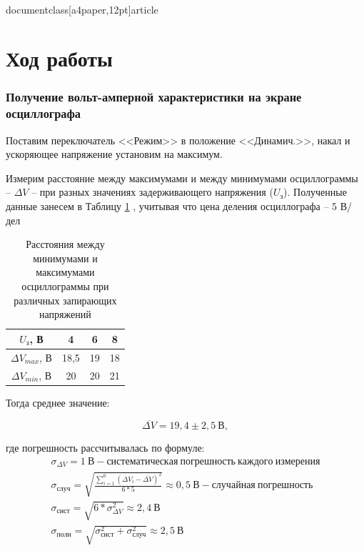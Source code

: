 \\documentclass[a4paper,12pt]{article}
\begin{document}
\section*{Ход работы}

\subsubsection*{Получение вольт-амперной характеристики на экране осциллографа}

Поставим переключатель <<Режим>> в положение <<Динамич.>>, накал и ускоряющее напряжение установим на максимум.

Измерим расстояние между максимумами и между минимумами осциллограммы -- $\Delta V$ -- при разных значениях задерживающего напряжения ($U_з$). Полученные данные занесем в Таблицу \ref{table1} , учитывая что цена деления осциллографа -- 5 В/дел

\begin{table}[h!]
	\begin{center}
	\caption{Расстояния между минимумами и максимумами осциллограммы при различных запирающих напряжений}
	\label{table1}
	\begin{tabular}{|c|c|c|c|}
		\hline
		$U_з$, В & 4 & 6 & 8 \\ \hline
		$\Delta V_{max}$, В & 18,5 & 19 & {\color[HTML]{000000} 18} \\ \hline
		$\Delta V_{min}$, В & 20 & 20 & 21 \\ \hline
	\end{tabular}
	\end{center}
\end{table}

\newpage

Тогда среднее значение:

$$
	\overline {\Delta V} = 19,4 \pm 2,5 \ В,
$$

где погрешность рассчитывалась по формуле:
\begin{gather*}
	\sigma_{\Delta V} = 1 \ В - систематическая \ погрешность \ каждого \ измерения \\	
	\sigma_{случ} = \sqrt{\frac{\sum \limits_{i=1}^{6} (\Delta V_i - \overline {\Delta V})^2 }{6 * 5}} \approx 0,5 \ В - случайная \ погрешность \\
	\sigma_{сист} = \sqrt{6 * \sigma_{\Delta V}^2} \approx 2,4 \ В \\
	\sigma_{полн} = \sqrt{\sigma_{сист}^2 + \sigma_{случ}^2} \approx 2,5 \ В
\end{gather*}
\end{document}
